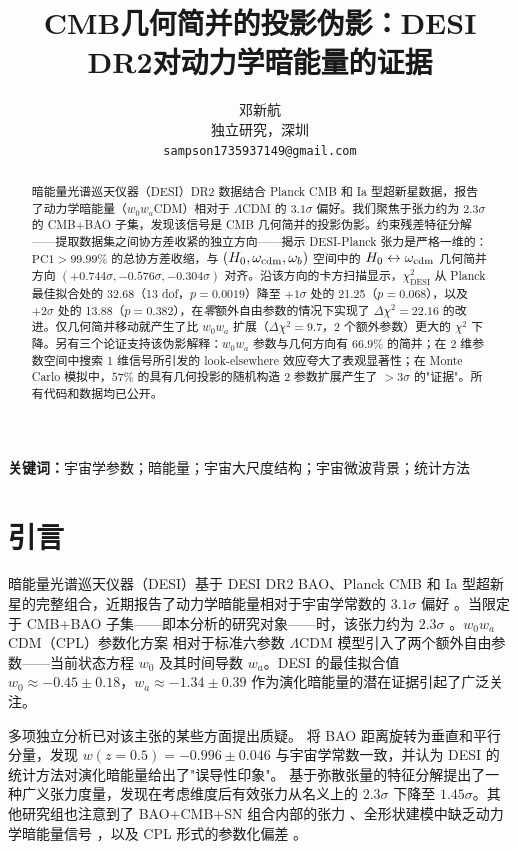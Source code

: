 \documentclass[12pt]{ctexart}
\title{CMB几何简并的投影伪影：DESI DR2对动力学暗能量的证据}
\author{邓新航\\[2pt] \small 独立研究，深圳\\[0pt] \small\texttt{sampson1735937149@gmail.com}}
\begin{document}
\maketitle

\begin{abstract}
暗能量光谱巡天仪器（DESI）DR2 数据结合 Planck CMB 和 Ia 型超新星数据，报告了动力学暗能量（$w_0 w_a$CDM）相对于 $\Lambda$CDM 的 $3.1\sigma$ 偏好。我们聚焦于张力约为 $2.3\sigma$ 的 CMB+BAO 子集，发现该信号是 CMB 几何简并的投影伪影。约束残差特征分解——提取数据集之间协方差收紧的独立方向——揭示 DESI-Planck 张力是严格一维的：$\mathrm{PC1} > 99.99\%$ 的总协方差收缩，与 $(H_0, \omega_{\rm cdm}, \omega_b)$ 空间中的 $H_0 \leftrightarrow \omega_{\rm cdm}$ 几何简并方向 $(+0.744\sigma, -0.576\sigma, -0.304\sigma)$ 对齐。沿该方向的卡方扫描显示，$\chi^2_{\mathrm{DESI}}$ 从 Planck 最佳拟合处的 32.68（13 dof，$p=0.0019$）降至 $+1\sigma$ 处的 21.25（$p=0.068$），以及 $+2\sigma$ 处的 13.88（$p=0.382$），在{\em 零}额外自由参数的情况下实现了 $\Delta\chi^2 = 22.16$ 的改进。仅几何简并移动就产生了比 $w_0 w_a$ 扩展（$\Delta\chi^2 = 9.7$，2 个额外参数）更大的 $\chi^2$ 下降。另有三个论证支持该伪影解释：$w_0 w_a$ 参数与几何方向有 $66.9\%$ 的简并；在 2 维参数空间中搜索 1 维信号所引发的 look-elsewhere 效应夸大了表观显著性；在 Monte Carlo 模拟中，$57\%$ 的具有几何投影的随机构造 2 参数扩展产生了 $>3\sigma$ 的"证据"。所有代码和数据均已公开。
\end{abstract}

{\small \textbf{关键词：}宇宙学参数；暗能量；宇宙大尺度结构；宇宙微波背景；统计方法}

\section{引言}
\label{sec:intro}

暗能量光谱巡天仪器（DESI）基于 DESI DR2 BAO、Planck CMB 和 Ia 型超新星的完整组合，近期报告了动力学暗能量相对于宇宙学常数的 $3.1\sigma$ 偏好 \citep{desi2025dr2}。当限定于 CMB+BAO 子集——即本分析的研究对象——时，该张力约为 $2.3\sigma$ \citep{leizerovich2025}。$w_0 w_a$CDM（CPL）参数化方案 \citep{chevallier2001, linder2003} 相对于标准六参数 $\Lambda$CDM 模型引入了两个额外自由参数——当前状态方程 $w_0$ 及其时间导数 $w_a$。DESI 的最佳拟合值 $w_0 \approx -0.45 \pm 0.18$，$w_a \approx -1.34 \pm 0.39$ 作为演化暗能量的潜在证据引起了广泛关注。

多项独立分析已对该主张的某些方面提出质疑。\citet{efstathiou2025} 将 BAO 距离旋转为垂直和平行分量，发现 $w(z=0.5) = -0.996 \pm 0.046$ 与宇宙学常数一致，并认为 DESI 的统计方法对演化暗能量给出了"误导性印象"。\citet{leizerovich2025} 基于弥散张量的特征分解提出了一种广义张力度量，发现在考虑维度后有效张力从名义上的 $2.3\sigma$ 下降至 $1.45\sigma$。其他研究组也注意到了 BAO+CMB+SN 组合内部的张力 \citep{wang2025epjc}、全形状建模中缺乏动力学暗能量信号 \citep{oc4}，以及 CPL 形式的参数化偏差 \citep{dinda2025, lee2025}。
\end{document}
